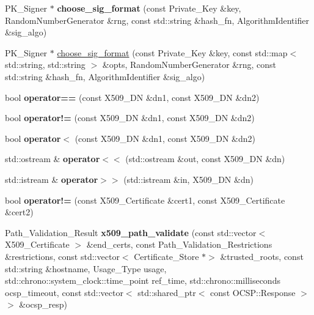 \begin{DoxyCompactItemize}
\mbox{\label{namespace_botan_ac8d2bcad93c3e6cf32273640aa741f37}} 
P\+K\+\_\+\+Signer $\ast$ {\bfseries choose\+\_\+sig\+\_\+format} (const Private\+\_\+\+Key \&key, Random\+Number\+Generator \&rng, const std\+::string \&hash\+\_\+fn, Algorithm\+Identifier \&sig\+\_\+algo)
\item 
P\+K\+\_\+\+Signer $\ast$ \mbox{\hyperlink{namespace_botan_a0e7eef69e50c79362b967f2c4f81a377}{choose\+\_\+sig\+\_\+format}} (const Private\+\_\+\+Key \&key, const std\+::map$<$ std\+::string, std\+::string $>$ \&opts, Random\+Number\+Generator \&rng, const std\+::string \&hash\+\_\+fn, Algorithm\+Identifier \&sig\+\_\+algo)
\item 
\mbox{\label{namespace_botan_a9ad1f31689c39db82eb02a19f651276c}} 
bool {\bfseries operator==} (const X509\+\_\+\+DN \&dn1, const X509\+\_\+\+DN \&dn2)
\item 
\mbox{\label{namespace_botan_a476b8723316dafb87967766b17a8b225}} 
bool {\bfseries operator!=} (const X509\+\_\+\+DN \&dn1, const X509\+\_\+\+DN \&dn2)
\item 
\mbox{\label{namespace_botan_a48bb7e22006211397839397df0d6c89d}} 
bool {\bfseries operator$<$} (const X509\+\_\+\+DN \&dn1, const X509\+\_\+\+DN \&dn2)
\item 
\mbox{\label{namespace_botan_a7d050440a804945a0f924dcf7e1b2b98}} 
std\+::ostream \& {\bfseries operator$<$$<$} (std\+::ostream \&out, const X509\+\_\+\+DN \&dn)
\item 
\mbox{\label{namespace_botan_a1a3aca29ac12ded8d64510c3dfbf8c45}} 
std\+::istream \& {\bfseries operator$>$$>$} (std\+::istream \&in, X509\+\_\+\+DN \&dn)
\item 
\mbox{\label{namespace_botan_a7151f34db6b33b3763e5554759e08dec}} 
bool {\bfseries operator!=} (const X509\+\_\+\+Certificate \&cert1, const X509\+\_\+\+Certificate \&cert2)
\item 
\mbox{\label{namespace_botan_a43f20522071bd2b78c5125c3080f778a}} 
Path\+\_\+\+Validation\+\_\+\+Result {\bfseries x509\+\_\+path\+\_\+validate} (const std\+::vector$<$ X509\+\_\+\+Certificate $>$ \&end\+\_\+certs, const Path\+\_\+\+Validation\+\_\+\+Restrictions \&restrictions, const std\+::vector$<$ Certificate\+\_\+\+Store $\ast$$>$ \&trusted\+\_\+roots, const std\+::string \&hostname, Usage\+\_\+\+Type usage, std\+::chrono\+::system\+\_\+clock\+::time\+\_\+point ref\+\_\+time, std\+::chrono\+::milliseconds ocsp\+\_\+timeout, const std\+::vector$<$ std\+::shared\+\_\+ptr$<$ const O\+C\+S\+P\+::\+Response $>$$>$ \&ocsp\+\_\+resp)

\end{DoxyCompactItemize}
